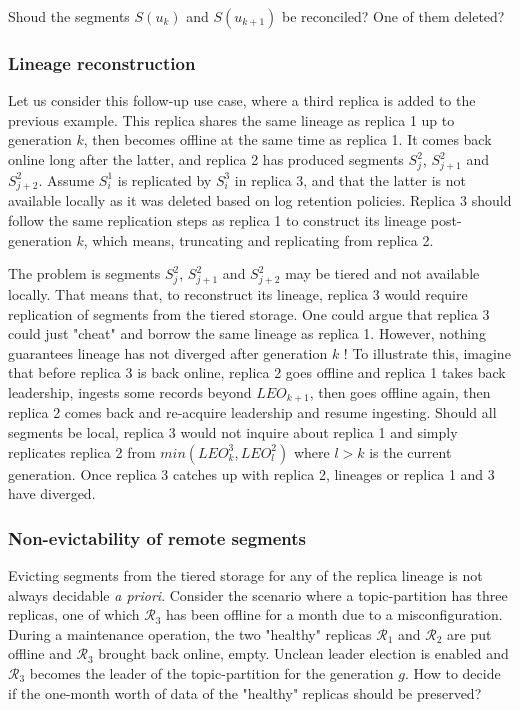 \documentclass{article}
\begin{document}
Shoud the segments $S(u_k)$ and $S(u_{k+1})$ be reconciled? One of them deleted? 

\subsubsection{Lineage reconstruction}

Let us consider this follow-up use case, where a third replica is added to the previous example. This replica shares the same lineage as replica 1 up to generation $k$, then becomes offline at the same time as replica 1. It comes back online long after the latter, and replica 2 has produced segments $S_j^2$, $S_{j+1}^2$ and $S_{j+2}^2$. Assume $S_i^1$ is replicated by $S_i^3$ in replica 3, and that the latter is not available locally as it was deleted based on log retention policies. Replica 3 should follow the same replication steps as replica 1 to construct its lineage post-generation $k$, which means, truncating and replicating from replica 2.

The problem is segments $S_j^2$, $S_{j+1}^2$ and $S_{j+2}^2$ may be tiered and not available locally. That means that, to reconstruct its lineage, replica 3 would require replication of segments from the tiered storage. One could argue that replica 3 could just "cheat" and borrow the same lineage as replica 1. However, nothing guarantees lineage has not diverged after generation $k$ ! To illustrate this, imagine that before replica 3 is back online, replica 2 goes offline and replica 1 takes back leadership, ingests some records beyond $LEO_{k+1}$, then goes offline again, then replica 2 comes back and re-acquire leadership and resume ingesting. Should all segments be local, replica 3 would not inquire about replica 1 and simply replicates replica 2 from $min(LEO_{k}^3, LEO_l^2)$ where $l > k$ is the current generation. Once replica 3 catches up with replica 2, lineages or replica 1 and 3 have diverged.

\subsubsection{Non-evictability of remote segments}

Evicting segments from the tiered storage for any of the replica lineage is not always decidable \textit{a priori}. Consider the scenario where a topic-partition has three replicas, one of which $\mathcal{R}_3$ has been offline for a month due to a misconfiguration. During a maintenance operation, the two "healthy" replicas $\mathcal{R}_1$ and $\mathcal{R}_2$ are put offline and $\mathcal{R}_3$ brought back online, empty. Unclean leader election is enabled and $\mathcal{R}_3$ becomes the leader of the topic-partition for the generation $g$. How to decide if the one-month worth of data of the "healthy" replicas should be preserved?
\end{document}
